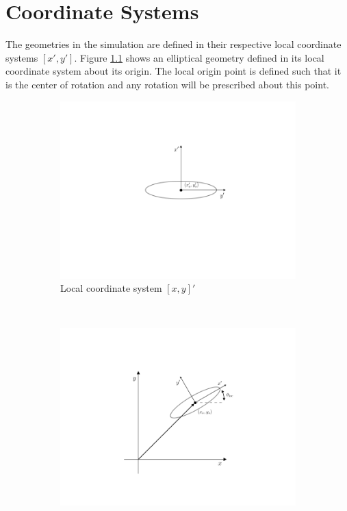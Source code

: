 \chapter{Coordinate Systems}
\label{app:coordinateSystems}
The geometries in the simulation are defined in their respective local coordinate systems $[x',y']$. Figure \ref{fig:localPosition2} shows an elliptical geometry defined in its local coordinate system about its origin. The local origin point is defined such that it is the center of rotation and any rotation will be prescribed about this point.

	\begin{figure}[h]
     \centering
     \begin{subfigure}[t]{0.45\textwidth}
             \includegraphics[trim=4.5cm 2.cm 3.5cm 1.5cm, clip, width=\linewidth]{./figures/coupling/interpolation/ellipse/localOrientation2.png}
             \caption{Local coordinate system $[x,y]'$}
             \label{fig:localPosition2}
     \end{subfigure}%
     ~ %
     \begin{subfigure}[t]{0.45\textwidth}
             \includegraphics[trim=4.5cm 2.cm 3.5cm 1.5cm, clip, width=\linewidth]{./figures/coupling/interpolation/ellipse/globalOrientation.png}

\end{subfigure}
\end{figure}
